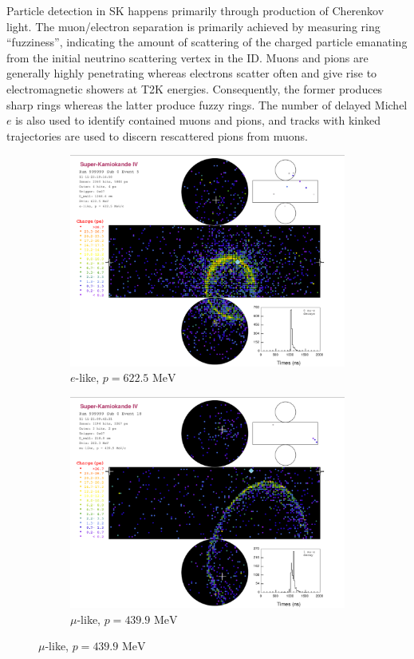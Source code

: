 Particle detection in SK happens primarily through production of Cherenkov light. The muon/electron separation is primarily achieved by measuring ring ``fuzziness'', indicating the amount of scattering of the charged particle emanating from the initial neutrino scattering vertex in the ID. Muons and pions are generally highly penetrating whereas electrons scatter often and give rise to electromagnetic showers at T2K energies. Consequently, the former produces sharp rings whereas the latter produce fuzzy rings. The number of delayed Michel $e$ is also used to identify contained muons and pions, and tracks with kinked trajectories are used to discern rescattered pions from muons.
\begin{figure}[h]
	\begin{subfigure}[t]{0.48\textwidth}
		\includegraphics[width=\textwidth, trim={0mm 0mm 0mm 3mm}, clip,page=1]{figures/det_chap/sk/elike.pdf}
		\caption{$e$-like, $p=622.5\text{ MeV}$}
	\end{subfigure}
	\begin{subfigure}[t]{0.48\textwidth}
		\includegraphics[width=\textwidth, trim={0mm 0mm 0mm 3mm}, clip,page=1]{figures/det_chap/sk/mulike.pdf}
		\caption{$\mu$-like, $p=439.9\text{ MeV}$}
	\end{subfigure}
\end{figure}

